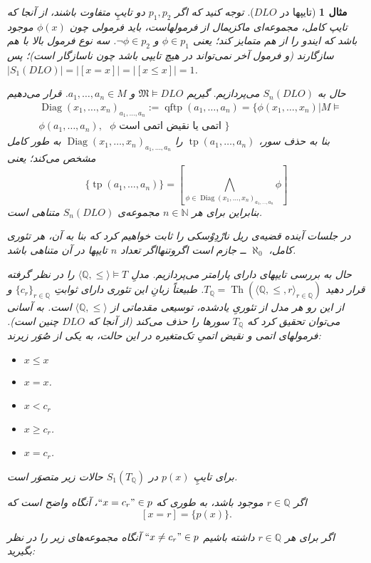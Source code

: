 \documentclass[12pt,a4paper]{report}
\theoremstyle{colorhead}
\newtheorem{mesal}[thm]{مثال}
\DeclareMathOperator{\Th}{Th}
\DeclareMathOperator{\diag}{Diag}
\DeclareMathOperator{\qftp}{qftp}
\DeclareMathOperator{\tp}{tp}
\begin{document}
\begin{mesal}[تایپها در
$DLO$]
توجه کنید که اگر 
$p_1,p_2$
دو تایپِ متفاوت باشند، از آنجا که تایپ کامل، مجموعه‌ای ماکزیمال از فرمولهاست، باید
فرمولی چون
$\phi(x)$
موجود باشد که ایندو را از هم متمایز کند؛ یعنی
$\phi\in p_1$
و
$\neg \phi\in p_2$.
سه نوع فرمول بالا با هم سازگارند (و فرمول آخر نمی‌تواند در هیچ تایپی باشد چون ناسازگار است)؛ پس
$|S_1(DLO)|=|[x=x]|=|[x\leq x]|=1$.
\par 
حال به
$S_n(DLO)$
می‌پردازیم.
گیریم
$\mathfrak{M}\models DLO$
و
$a_1,\ldots,a_n\in M$.
قرار می‌دهیم
\begin{align*}
&
\diag(x_1,\ldots,x_n)_{a_1,\ldots,a_n}:=\qftp(a_1,\ldots,a_n)=
\{\phi(x_1,\ldots,x_n)|M\models \\
&
\phi(a_1,\ldots,a_n), \text{ $\phi$ اتمی یا نقیض اتمی است }
\}
\end{align*}
بنا به حذف سور،
$\tp(a_1,\ldots,a_n)$
را
$\diag(x_1,\ldots,x_n)_{a_1,\ldots,a_n}$
به طور کامل مشخص می‌کند؛ یعنی
\[
\{\tp(a_1,\ldots,a_n)\}=[\bigwedge_{\phi\in \diag(x_1,\ldots,x_n)_{a_1,\ldots,a_n} }\phi]
\]
بنابراین
برای هر
$n\in \mathbb{N}$
مجموعه‌ی
$S_n(DLO)$
متناهی است.
\par 
در جلسات آینده قضیه‌ی
ریل‌ نارْدِوْسکی
را ثابت خواهیم کرد که بنا به آن، هر تئوری کامل،
$\aleph_0$
ــ
جازم است اگروتنهااگر تعداد
$n$
تایپها در آن متناهی باشد. 
\par 
حال به بررسی تایپهای دارای پارامتر می‌پردازیم. مدلِ
$\langle \mathbb{Q},\leq\rangle \models T$
را در نظر گرفته قرار دهید
$T_\mathbb{Q}=\Th(\langle\mathbb{Q},\leq,r\rangle_{r\in \mathbb{Q}})$.
طبیعتاً زبانِ این تئوری دارای ثوابتِ
$\{c_r\}_{r\in \mathbb{Q}}$
و از این رو هر مدل از تئوریِ یادشده، توسیعی مقدماتی از
$\langle \mathbb{Q},\leq\rangle$
است. 
به آسانی می‌توان تحقیق کرد که
$T_\mathbb{Q}$
سورها را حذف می‌کند (از آنجا که
$DLO$
چنین است). فرمولهای اتمی و نقیض اتمیِ تک‌متغیره در این حالت، به یکی از صُوَر زیرند:
\begin{itemize}
\item $x\leq x$
\item $x=x$.
\item $x<c_r$
\item $x\geq c_r$.
\item $x=c_r$.
\end{itemize}
برای تایپِ
$p(x)$
 در
$S_1(T_\mathbb{Q})$
حالات زیر متصوَر است.
\par 
اگر
$r\in \mathbb{Q}$
موجود باشد، به طوری که 
$``x=c_r"\in p$، 
آنگاه واضح است که 
\[
[x=r]=\{p(x)\}.
\]
\item
اگر
برای هر
$r\in \mathbb{Q}$
داشته باشیم
$``x\not=c_r"\in p$
آنگاه مجموعه‌های زیر را در نظر بگیرید:

\end{mesal}
\end{document}
